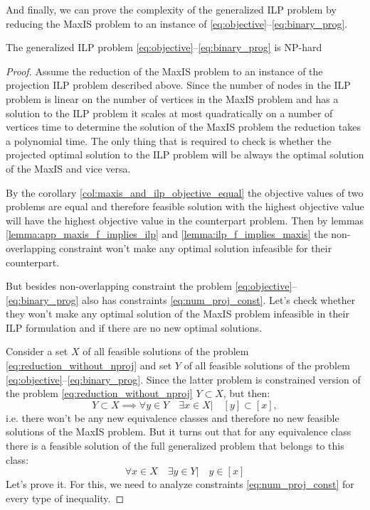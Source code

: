 And finally, we can prove the complexity of the generalized ILP problem by reducing the MaxIS problem
to an instance of \eqref{eq:objective}--\eqref{eq:binary_prog}.
\begin{theorem}
  The generalized ILP problem \eqref{eq:objective}--\eqref{eq:binary_prog} is NP-hard
\end{theorem}
\begin{proof}
  Assume the reduction of the MaxIS problem to an instance of the projection ILP problem described above.
  Since the number of nodes in the ILP problem is linear on the number of vertices in the MaxIS problem and
  has a solution to the ILP problem it scales at most quadratically on a number of vertices time to
  determine the solution of the MaxIS problem the reduction takes a polynomial time.
  The only thing that is required to check is whether the projected optimal solution to the ILP problem
  will be always the optimal solution of the MaxIS and vice versa.

  By the corollary \ref{col:maxis_and_ilp_objective_equal} the objective values of two problems are equal and therefore
  feasible solution with the highest objective value will have the highest objective value in the counterpart problem.
  Then by lemmas \ref{lemma:app_maxis_f_implies_ilp} and \ref{lemma:ilp_f_implies_maxis} the non-overlapping constraint
  won't make any optimal solution infeasible for their counterpart.

  But besides non-overlapping constraint the problem \eqref{eq:objective}--\eqref{eq:binary_prog} also has
  constraints \eqref{eq:num_proj_const}. Let's check whether they won't make any optimal solution of the MaxIS
  problem infeasible in their ILP formulation and if there are no new optimal solutions.

  Consider a set \( X \) of all feasible solutions of the problem \eqref{eq:reduction_without_nproj} and
  set \( Y \) of all feasible solutions of the problem \eqref{eq:objective}--\eqref{eq:binary_prog}. Since
  the latter problem is constrained version of the problem \eqref{eq:reduction_without_nproj} \( Y \subset X \), but then:
  \[
    Y \subset X \implies \forall y \in Y \quad \exists x \in X \Big| \quad [y] \subset [x],
  \]
  i.e. there won't be any new equivalence classes and therefore no new feasible solutions of the MaxIS problem.
  But it turns out that for any equivalence class there is a feasible solution of the full generalized problem that belongs to this class:
  \[
    \forall x \in X \quad \exists y \in Y \Big| \quad y \in [x]
  \]
  Let's prove it. For this, we need to analyze constraints \eqref{eq:num_proj_const} for every type of inequality.


\end{proof}

